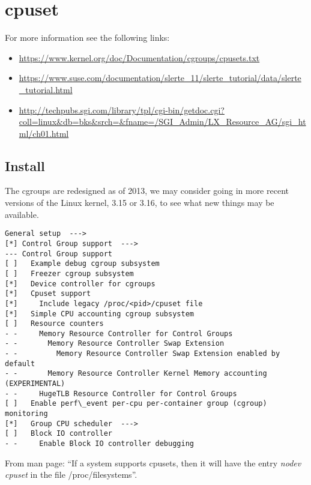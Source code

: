 \section{cpuset}
\tested{}


For more information see the following links:
\begin{itemize}
 \item \url{https://www.kernel.org/doc/Documentation/cgroups/cpusets.txt}
 \item \url{https://www.suse.com/documentation/slerte_11/slerte_tutorial/data/slerte_tutorial.html}
 \item \url{http://techpubs.sgi.com/library/tpl/cgi-bin/getdoc.cgi?coll=linux&db=bks&srch=&fname=/SGI_Admin/LX_Resource_AG/sgi_html/ch01.html}
\end{itemize}

\subsection{Install}

The cgroups are redesigned as of 2013, we may consider going in more recent versions of the Linux kernel, 3.15 or 3.16, to see what new things may be available.

\begin{verbatim}
General setup  --->
[*] Control Group support  --->
--- Control Group support
[ ]   Example debug cgroup subsystem
[ ]   Freezer cgroup subsystem
[*]   Device controller for cgroups                                                                 
[*]   Cpuset support                                                                                
[*]     Include legacy /proc/<pid>/cpuset file                                                      
[*]   Simple CPU accounting cgroup subsystem                                                        
[ ]   Resource counters
- -     Memory Resource Controller for Control Groups
- -       Memory Resource Controller Swap Extension
- -         Memory Resource Controller Swap Extension enabled by default
- -       Memory Resource Controller Kernel Memory accounting (EXPERIMENTAL)
- -     HugeTLB Resource Controller for Control Groups
[ ]   Enable perf\_event per-cpu per-container group (cgroup) monitoring
[*]   Group CPU scheduler  --->
[ ]   Block IO controller
- -     Enable Block IO controller debugging
\end{verbatim}


From man page: ``If a system supports cpusets, then it will have the entry \textit{nodev cpuset} in the file /proc/filesystems''.

